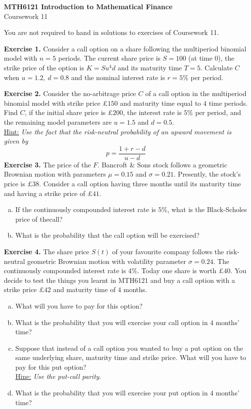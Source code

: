 \documentclass[11pt,a4paper]{article}
\begin{document}
    \begin{center}
        \LARGE\textbf{MTH6121 Introduction to Mathematical Finance}\\
        Coursework 11
    \end{center}
    You are not required to hand in solutions to exercises of Coursework 11.\par 
    \textbf{Exercise 1.} Consider a call option on a share following the multiperiod binomial model with $n = 5$ periods. The current share price is $S = 100$ (at time 0), the strike price of the option is $K = Su^4d$ and its maturity time $T = 5$. Calculate $C$ when $u = 1.2,\ d = 0.8$ and the nominal interest rate is $r = 5\%$ per period.\par 
    \textbf{Exercise 2.} Consider the no-arbitrage price $C$ of a call option in the multiperiod binomial model with strike price $\pounds 150$ and maturity time equal to $4$ time periods. Find $C$, if the initial share price is $\pounds 200$, the interest rate is $5\%$ per period, and the remaining model parameters are $u = 1.5$ and $d = 0.5$.\\
    \hspace*{0.5cm}\underline{Hint:} \textsl{Use the fact that the risk-neutral probability of an upward movement is given by}
    $$
    p = \frac{1+r-d}{u-d}
    $$
    \textbf{Exercise 3.} The price of the $F$. Bancroft \& Sons stock follows a geometric Brownian motion with parameters $\mu = 0.15$ and $\sigma = 0.21$. Presently, the stock’s price is $\pounds 38$. Consider a call option having three months until its maturity time and having a strike price of $\pounds 41$.
    \begin{enumerate}[(a)]
        \item If the continuously compounded interest rate is $5\%$, what is the Black-Scholes price of thecall?
        \item What is the probability that the call option will be exercised?
    \end{enumerate}
    \textbf{Exercise 4.} The share price $S(t)$ of your favourite company follows the risk-neutral geometric Brownian motion with volatility parameter $\sigma = 0.24$. The continuously compounded interest rate is $4\%$. Today one share is worth $\pounds 40$. You decide to test the things you learnt in MTH6121 and buy a call option with a strike price $\pounds 42$ and maturity time of $4$ months.
    \begin{enumerate}[(a)]
        \item What will you have to pay for this option?
        \item What is the probability that you will exercise your call option in $4$ months’ time?
        \item Suppose that instead of a call option you wanted to buy a put option on the same underlying share, maturity time and strike price. What will you have to pay for this put option?\\
        \underline{Hine:} \textsl{Use the put-call parity.}
        \item What is the probability that you will exercise your put option in $4$ months’ time?
    \end{enumerate}
\end{document}
